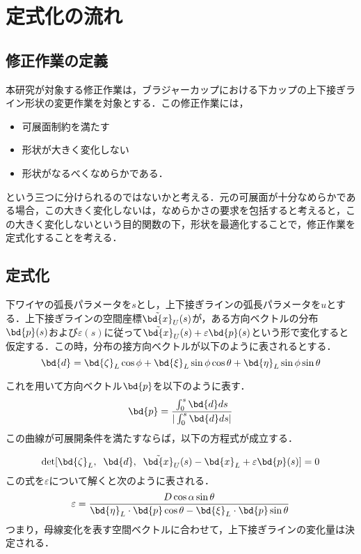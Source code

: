 \newcommand{\STP}[3]{\det[#1,\; #2,\; #3]}

\section{定式化の流れ}
	\subsection{修正作業の定義}
		本研究が対象する修正作業は，ブラジャーカップにおける下カップの上下接ぎライン形状の変更作業を対象とする．この修正作業には，
		\begin{itemize}
			\item 可展面制約を満たす
			\item 形状が大きく変化しない
			\item 形状がなるべくなめらかである．
		\end{itemize}
		という三つに分けられるのではないかと考える．元の可展面が十分なめらかである場合，この大きく変化しないは，なめらかさの要求を包括すると考えると，この大きく変化しないという目的関数の下，形状を最適化することで，修正作業を定式化することを考える．
		
	\subsection{定式化}
		下ワイヤの弧長パラメータを$ s $とし，上下接ぎラインの弧長パラメータを$ u $とする．上下接ぎラインの空間座標$ \tilde{\bd{x}}_U(s) $が，ある方向ベクトルの分布$ \bd{p}(s) $および$ \varepsilon(s) $に従って$ \tilde{\bd{x}}_U(s) + \varepsilon \bd{p}(s) $という形で変化すると仮定する．この時，分布の接方向ベクトルが以下のように表されるとする．
		\begin{equation}\label{eq:d_eq}
			\bd{d} = \bd{\zeta}_L \cos \phi + \bd{\xi}_L \sin \phi \cos \theta + \bd{\eta}_L \sin \phi \sin \theta
		\end{equation}
		
		これを用いて方向ベクトル$ \bd{p} $を以下のように表す．
		\begin{equation}\label{eq:p_eq}
			\bd{p} = \frac{\int_{0}^{s} \bd{d} ds}{|\int_{0}^{s} \bd{d} ds|}
		\end{equation}
		この曲線が可展開条件を満たすならば，以下の方程式が成立する．
		
		\begin{equation}\label{eq:dev_eq}
			\det [\bd{\zeta}_L,\;\; \bd{d},\;\; \tilde{\bd{x}}_U(s) - \bd{x}_L + \varepsilon \bd{p}(s) ] = 0
		\end{equation}
		この式を$ \varepsilon $について解くと次のように表される．
		\begin{equation}\label{eq:varep_eq}
			\varepsilon = \frac{D\cos \alpha \sin \theta }{\bd{\eta}_L \cdot \bd{p} \cos \theta - \bd{\xi}_L \cdot \bd{p} \sin \theta}
		\end{equation}
		つまり，母線変化を表す空間ベクトルに合わせて，上下接ぎラインの変化量は決定される．
		
